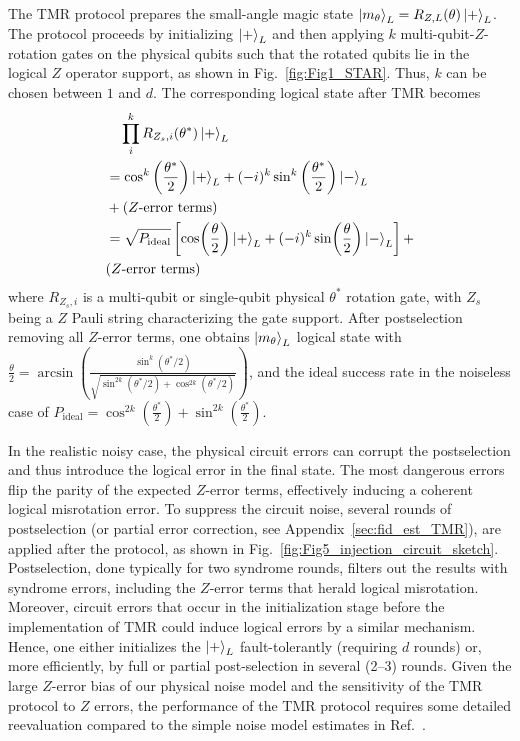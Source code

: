 \documentclass[aps, prx, reprint, superscriptaddress, longbibliography, floatfix]{revtex4-2}
\begin{document}
The TMR protocol \cite{Toshio2024,Choi2023} prepares the small-angle magic state $ \ket{m_\theta}_L=R_{Z,L}(\theta)\ket{+}_L$. The protocol proceeds by initializing $\ket{+}_L$ and then applying $k$ multi-qubit-$Z$-rotation gates on the physical qubits such that the rotated qubits lie in the logical $Z$ operator support, as shown in Fig.~\ref{fig:Fig1_STAR}. Thus, $k$ can be chosen between $1$ and $d$. The corresponding logical state after TMR becomes
\begin{align}
\begin{split}
\label{eq:R_z}
    &\quad\prod_{i}^{k} R_{Z_s,i}(\theta^*)\ket{+}_L\\
   & =\cos^k\left(\frac{\theta^*}{2}\right)\ket{+}_L +(-i)^k \sin^k\left(\frac{\theta^*}{2}\right)\ket{-}_L\\
   &+(\text{$Z$-error terms})\\&
    = {\sqrt{P_{\text{ideal}}}} \left [ \cos(\frac{\theta}{2})\ket{+}_L +(-i)^k \sin(\frac{\theta}{2})\ket{-}_L \right ]+\\&
    (\text{$Z$-error terms})
\end{split}
\end{align}
where $R_{Z_s,i}$ is a multi-qubit or single-qubit physical $\theta^*$ rotation gate, with $Z_s$ being a $Z$ Pauli string characterizing the gate support. After postselection removing all $Z$-error terms, one obtains $\ket{m_\theta}_L$ logical state with $\frac{\theta}{2} =\arcsin(\frac{\sin^k(\theta^*/2)}{\sqrt{\sin^{2k}(\theta^*/2)+\cos^{2k}(\theta^*/2)}})$, and the ideal success rate in the noiseless case of $P_{\text{ideal}}=\cos^{2k}\left ( \frac{\theta^*}{2} \right )+\sin^{2k}\left ( \frac{\theta^*}{2} \right )$. 

In the realistic noisy case, the physical circuit errors can corrupt the postselection and thus introduce the logical error in the final state. The most dangerous errors flip the parity of the expected $Z$-error terms, effectively inducing a coherent logical misrotation error. To suppress the circuit noise, several rounds of postselection (or partial error correction, see Appendix~\ref{sec:fid_est_TMR}), are applied after the protocol, as shown in Fig.~\ref{fig:Fig5_injection_circuit_sketch}. Postselection, done typically for two syndrome rounds, filters out the results with syndrome errors, including the $Z$-error terms that herald logical misrotation. Moreover, circuit errors that occur in the initialization stage before the implementation of TMR could induce logical errors by a similar mechanism. Hence, one either initializes the $\ket{+}_L$ fault-tolerantly (requiring $d$ rounds) or, more efficiently, by full or partial post-selection in several (2--3) rounds.  Given the large $Z$-error bias of our physical noise model and the sensitivity of the TMR protocol to $Z$ errors, the performance of the TMR protocol requires some detailed reevaluation compared to the simple noise model estimates in Ref.~\cite{Choi2023, Toshio2024}.
\end{document}
